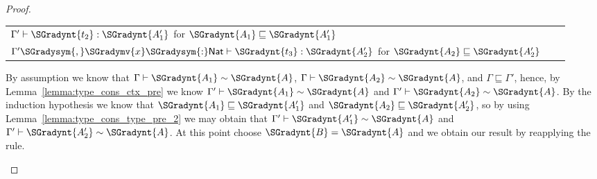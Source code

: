 \begin{proof}
\begin{itemize}
\begin{center}
\begin{tabular}{lll}
        $ \Gamma'  \vdash  \SGradynt{t_{{\mathrm{2}}}}  :  \SGradynt{A'_{{\mathrm{1}}}} $ for $ \SGradynt{A_{{\mathrm{1}}}}  \sqsubseteq  \SGradynt{A'_{{\mathrm{1}}}} $\\
        $ \Gamma'  \SGradysym{,}  \SGradymv{x}  \SGradysym{:}   \mathsf{Nat}   \vdash  \SGradynt{t_{{\mathrm{3}}}}  :  \SGradynt{A'_{{\mathrm{2}}}} $ for $ \SGradynt{A_{{\mathrm{2}}}}  \sqsubseteq  \SGradynt{A'_{{\mathrm{2}}}} $
      \end{tabular}
    \end{center}
    By assumption we know that $ \Gamma  \vdash  \SGradynt{A_{{\mathrm{1}}}}  \sim  \SGradynt{A} $, $ \Gamma  \vdash  \SGradynt{A_{{\mathrm{2}}}}  \sim  \SGradynt{A} $, and $ \Gamma  \sqsubseteq  \Gamma' $,
    hence, by Lemma~\ref{lemma:type_cons_ctx_pre} we know $ \Gamma'  \vdash  \SGradynt{A_{{\mathrm{1}}}}  \sim  \SGradynt{A} $ and $ \Gamma'  \vdash  \SGradynt{A_{{\mathrm{2}}}}  \sim  \SGradynt{A} $.  
    By the induction hypothesis we know that $ \SGradynt{A_{{\mathrm{1}}}}  \sqsubseteq  \SGradynt{A'_{{\mathrm{1}}}} $ and $ \SGradynt{A_{{\mathrm{2}}}}  \sqsubseteq  \SGradynt{A'_{{\mathrm{2}}}} $, so
    by using Lemma~\ref{lemma:type_cons_type_pre_2} we may obtain that
    $ \Gamma'  \vdash  \SGradynt{A'_{{\mathrm{1}}}}  \sim  \SGradynt{A} $ and $ \Gamma'  \vdash  \SGradynt{A'_{{\mathrm{2}}}}  \sim  \SGradynt{A} $.  At this point choose $\SGradynt{B} = \SGradynt{A}$
    and we obtain our result by reapplying the rule.
    

\end{itemize}
\end{proof}
